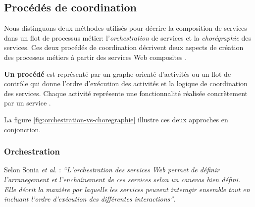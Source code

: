     \subsection{Procédés de coordination}
    \label{sec:proc-de-coord}
    



    Nous distinguons deux méthodes utilisés pour décrire la
    composition de services dans un flot de processus métier:
    l'\emph{orchestration} de services et la \emph{chorégraphie} des
    services. Ces deux procédés de coordination décrivent deux aspects
    de création des processus métiers à partir des services Web
    composites \cite{peltz2003web}.
    
    \textbf{Un procédé} est représenté par un graphe orienté
    d'activités ou un flot de contrôle qui donne l'ordre d'exécution
    des activités et la logique de coordination des services. Chaque
    activité représente une fonctionnalité réalisée concrètement par
    un service \cite{chollet2009orchestration}.

    La figure \ref{fig:orchestration-vs-choregraphie} illustre ces
    deux approches en conjonction.
           

      \subsubsection{Orchestration}
      \label{sec:orchestration-sec}
      Selon Sonia \emph{et al.} \cite{jamal2005environnement}:
      \emph{``L'orchestration des services Web permet de définir
        l'arranegement et l'enchaînement de ces services selon un
        canevas bien défini. Elle décrit la manière par laquelle les
        services peuvent interagir ensemble tout en incluant l'ordre
        d'exécution des différentes interactions''}.

